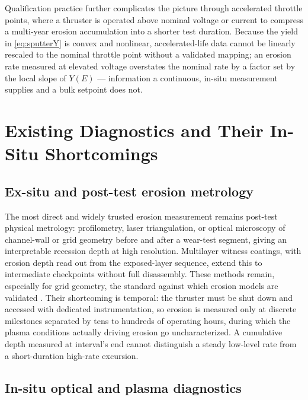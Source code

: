 Qualification practice further complicates the picture through accelerated throttle points, where a thruster is operated above nominal voltage or current to compress a multi-year erosion accumulation into a shorter test duration. Because the yield in \cref{eq:sputterY} is convex and nonlinear, accelerated-life data cannot be linearly rescaled to the nominal throttle point without a validated mapping; an erosion rate measured at elevated voltage overstates the nominal rate by a factor set by the local slope of $Y(E)$ — information a continuous, in-situ measurement supplies and a bulk setpoint does not.

\section{Existing Diagnostics and Their In-Situ Shortcomings}
\label{sec:ep-diagnostics}

\subsection{Ex-situ and post-test erosion metrology}

The most direct and widely trusted erosion measurement remains post-test physical metrology: profilometry, laser triangulation, or optical microscopy of channel-wall or grid geometry before and after a wear-test segment, giving an interpretable recession depth at high resolution. Multilayer witness coatings, with erosion depth read out from the exposed-layer sequence, extend this to intermediate checkpoints without full disassembly. These methods remain, especially for grid geometry, the standard against which erosion models are validated \cite{ref0480}. Their shortcoming is temporal: the thruster must be shut down and accessed with dedicated instrumentation, so erosion is measured only at discrete milestones separated by tens to hundreds of operating hours, during which the plasma conditions actually driving erosion go uncharacterized. A cumulative depth measured at interval's end cannot distinguish a steady low-level rate from a short-duration high-rate excursion.

\subsection{In-situ optical and plasma diagnostics}

